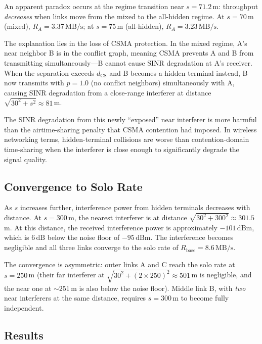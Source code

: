 \documentclass[11pt,a4paper]{article}
\newcommand{\MBs}{\,\text{MB/s}}
\newcommand{\dBm}{\,\text{dBm}}
\newcommand{\dB}{\,\text{dB}}
\begin{document}
An apparent paradox occurs at the regime transition near $s = 71.2\,$m: throughput \emph{decreases} when links move from the mixed to the all-hidden regime. At $s = 70\,$m (mixed), $R_A = 3.37\MBs$; at $s = 75\,$m (all-hidden), $R_A = 3.23\MBs$.

The explanation lies in the loss of CSMA protection. In the mixed regime, A's near neighbor B is in the conflict graph, meaning CSMA prevents A and B from transmitting simultaneously---B cannot cause SINR degradation at A's receiver. When the separation exceeds $d_{\text{CS}}$ and B becomes a hidden terminal instead, B now transmits with $p = 1.0$ (no conflict neighbors) simultaneously with A, causing SINR degradation from a close-range interferer at distance $\sqrt{30^2 + s^2} \approx 81\,$m.

The SINR degradation from this newly ``exposed'' near interferer is more harmful than the airtime-sharing penalty that CSMA contention had imposed. In wireless networking terms, hidden-terminal collisions are worse than contention-domain time-sharing when the interferer is close enough to significantly degrade the signal quality.

\subsection{Convergence to Solo Rate}

As $s$ increases further, interference power from hidden terminals decreases with distance. At $s = 300\,$m, the nearest interferer is at distance $\sqrt{30^2 + 300^2} \approx 301.5\,$m. At this distance, the received interference power is approximately $-101\dBm$, which is $6\dB$ below the noise floor of $-95\dBm$. The interference becomes negligible and all three links converge to the solo rate of $R_{\text{base}} = 8.6\MBs$.

The convergence is asymmetric: outer links A and C reach the solo rate at $s = 250\,$m (their far interferer at $\sqrt{30^2 + (2 \times 250)^2} \approx 501\,$m is negligible, and the near one at $\sim\!251\,$m is also below the noise floor). Middle link B, with \emph{two} near interferers at the same distance, requires $s = 300\,$m to become fully independent.

\subsection{Results}
\end{document}
